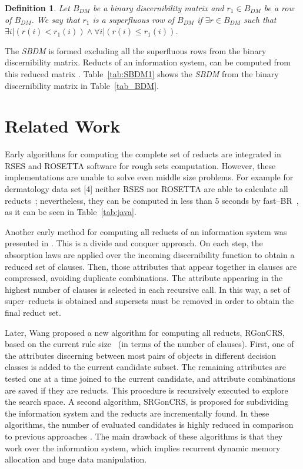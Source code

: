 \documentclass[number,preprint,review,12pt]{elsarticle}
\newtheorem{definition}{Definition}
\begin{document}
  \begin{definition}\label{def:basic_row}
	Let $B_{DM}$ be a binary discernibility matrix and $r_1 \in B_{DM}$ be a row of $B_{DM}$. We say that $r_1$ is a superfluous row of $B_{DM}$ if $\exists r \in B_{DM}$ such that $\exists i | (r(i) < r_1(i)) \wedge \forall i | (r(i) \leq r_1(i))$.
  \end{definition}

  The \textit{SBDM} is formed excluding all the superfluous rows from the binary discernibility matrix. Reducts of an information system, can be computed from this reduced matrix \citep{Yao09}. Table~\ref{tab:SBDM1} shows the \textit{SBDM} from the binary discernibility matrix in Table~\ref{tab_BDM}.

 
 
\section{Related Work}\label{relatedWork}

  Early algorithms for computing the complete set of reducts \citep{Bazan2001,Ohrn00} are integrated in RSES and ROSETTA software for rough sets computation. However, these implementations are unable to solve even middle size problems. For example for dermatology data set [4] neither RSES nor ROSETTA are able to calculate all reducts~\citep{Lazo15}; nevertheless, they can be computed in less than 5 seconds by fast--BR~\citep{Lias13}, as it can be seen in Table~\ref{tab:java}.

  Another early method for computing all reducts of an information system was presented in \cite{Starzyk99,Starzyk00}.  This is a divide and conquer approach. On each step, the absorption laws are applied over the incoming discernibility function to obtain a reduced set of clauses. Then, those attributes that appear together in  clauses are compressed, avoiding duplicate combinations. The attribute appearing in the highest number of clauses is selected in each recursive call. In this way, a set of super--reducts is obtained and supersets must be removed in order to obtain the final reduct set. 
   
  Later, Wang proposed a new algorithm for computing all reducts, RGonCRS, based on the current rule size~\cite{WangP07} (in terms of the number of clauses). First, one of the attributes discerning between most pairs of objects in different decision classes is added to the current candidate subset. The remaining attributes are tested one at a time joined to the current candidate, and attribute combinations are saved if they are reducts. This procedure is recursively executed to explore the search space. A second algorithm, SRGonCRS, is proposed for subdividing the information system and the reducts are incrementally found. In these algorithms, the number of evaluated candidates is highly reduced in comparison to previous approaches \citep{Bazan2001,Ohrn00}. The main drawback of these algorithms is that they work over the information system, which implies recurrent dynamic memory allocation and huge data manipulation.
  
\end{document}
